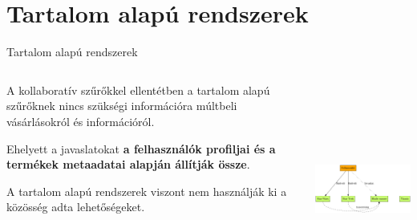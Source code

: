 \documentclass[english, aspectratio=169]{beamer}
\makeatletter
\let\origtableofcontents=\tableofcontents
\def\tableofcontents{\@ifnextchar[{\origtableofcontents}{\gobbletableofcontents}}
\def\gobbletableofcontents#1{\origtableofcontents}
\makeatother
\begin{document}
\section{Tartalom alapú rendszerek}

\begin{frame}
\tableofcontents[currentsection]
\end{frame}

\begin{frame}{Tartalom alapú rendszerek}
\begin{columns}
\begin{column}{.5\textwidth}
A kollaboratív szűrőkkel ellentétben a tartalom alapú szűrőknek nincs szükségi információra múltbeli vásárlásokról és információról.\par\medskip
Ehelyett a javaslatokat \textbf{a felhasználók profiljai és a termékek metaadatai alapján állítják össze}.\par\medskip
A tartalom alapú rendszerek viszont nem használják ki a közösség adta lehetőségeket.
\end{column}
\begin{column}{.5\textwidth}
\begin{center}
\includegraphics[width=7cm, height=7cm, keepaspectratio]{graphs/recommender_6.png}
\end{center}
\end{column}
\end{columns}
\end{frame}
\end{document}
